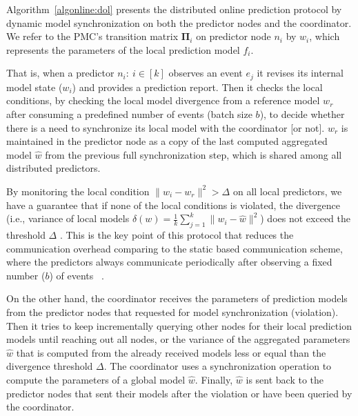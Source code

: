 \par Algorithm~\ref{algonline:dol} presents the distributed online prediction protocol by dynamic model synchronization on both the predictor nodes and the coordinator. We refer to the PMC's transition matrix $\boldsymbol{\Pi}_i$ on predictor node $n_i$ by $w_i$, which represents the parameters of the local prediction model $f_i$. 

\par That is, when a predictor $n_i:\ i \in[k]$ observes an event $e_j$ it revises its internal model state ($w_i$) and provides a prediction report. Then it checks the local conditions, by checking the local model divergence from a reference model $w_r$ after consuming a predefined number of events (batch size $b$), to decide whether there is a need to synchronize its local model with the coordinator [or not]. $w_r$ is maintained in the predictor node as a copy of the last computed aggregated model $\hat{w}$ from the previous full synchronization step, which is shared among all distributed predictors.

 \par By monitoring the local condition $\|w_i - w_r\|^2 > \Delta$ on all local predictors, we have a guarantee that if none of the local conditions is violated, the divergence (i.e., variance of local models $\delta(w)=\frac{1}{k} \sum_{j=1}^{k}\|w_i - \hat{w}\|^2$) does not exceed the threshold $\Delta$ \cite{kamp2014communication}. This is the key point of this protocol that reduces the communication overhead comparing to the static based communication scheme, where the predictors always communicate periodically after observing a fixed number ($b$) of events ~\cite{dekel2012optimal}.  

\par On the other hand, the coordinator receives the parameters of prediction models from the predictor nodes that requested for model synchronization (violation). Then it tries to keep incrementally querying other nodes for their local prediction models until reaching out all nodes, or the variance of the aggregated parameters $\hat{w}$ that is computed from the already received models less or equal than the divergence threshold $\Delta$. The coordinator uses a synchronization operation to compute the parameters of a global model  $\hat{w}$. Finally, $\hat{w}$ is sent back to the predictor nodes that sent their models after the violation or have been queried by the coordinator. 

